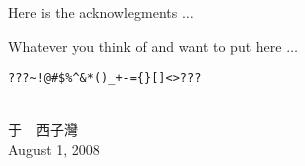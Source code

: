 \renewcommand{\thesisacknowledgmenthead}{Acknowledgments}
\begin{thesisacknowledgments}

  Here is the acknowlegments $\ldots$

  Whatever you think of and want to put here $\ldots$

  \vspace{1in}
  \verb|???~!@#$%^&*()_+-={}[]<>???|
  \vspace{1in}

  \myname\\
  于~~西子灣\\
  August 1, 2008
      
\end{thesisacknowledgments}

